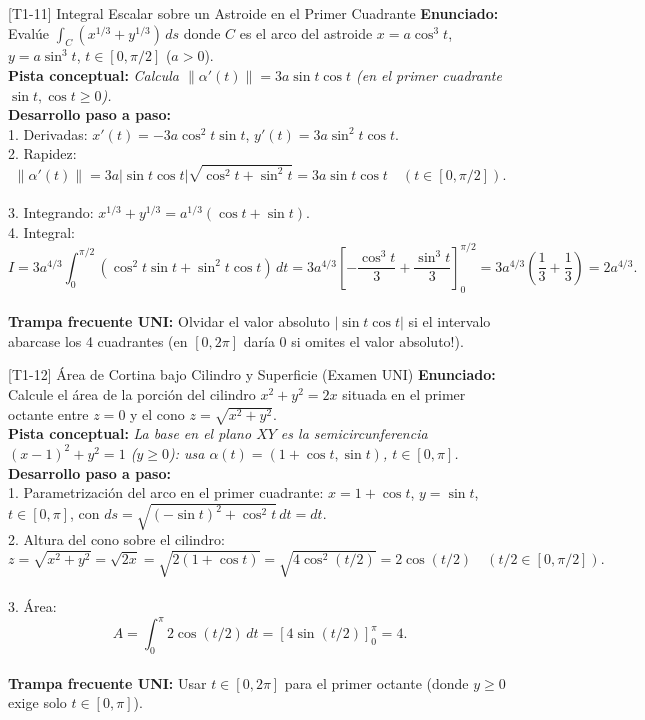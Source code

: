 \documentclass[11pt,a4paper]{article}
\begin{document}
\begin{ejerciciobox}{[T1-11] Integral Escalar sobre un Astroide en el Primer Cuadrante}
\textbf{Enunciado:} Evalúe $\int_C (x^{1/3} + y^{1/3})\,ds$ donde $C$ es el arco del astroide $x = a\cos^3 t$, $y = a\sin^3 t$, $t \in [0, \pi/2]$ ($a > 0$).\\[0.2cm]
\textbf{Pista conceptual:} \emph{Calcula $\|\alpha'(t)\| = 3a\sin t\cos t$ (en el primer cuadrante $\sin t, \cos t \ge 0$).}\\[0.2cm]
\textbf{Desarrollo paso a paso:}\\
1. Derivadas: $x'(t) = -3a\cos^2 t\sin t$, $y'(t) = 3a\sin^2 t\cos t$.\\
2. Rapidez:\\
$$\|\alpha'(t)\| = 3a|\sin t\cos t|\sqrt{\cos^2 t + \sin^2 t} = 3a\sin t\cos t \quad (t \in [0,\pi/2]).$$\\
3. Integrando: $x^{1/3} + y^{1/3} = a^{1/3}(\cos t + \sin t)$.\\
4. Integral:\\
$$I = 3a^{4/3}\int_0^{\pi/2} (\cos^2 t\sin t + \sin^2 t\cos t)\,dt = 3a^{4/3}\left[-\frac{\cos^3 t}{3} + \frac{\sin^3 t}{3}\right]_0^{\pi/2} = 3a^{4/3}\left(\frac{1}{3} + \frac{1}{3}\right) = 2a^{4/3}.$$\\[0.2cm]
\textbf{Trampa frecuente UNI:} Olvidar el valor absoluto $|\sin t\cos t|$ si el intervalo abarcase los 4 cuadrantes (en $[0,2\pi]$ daría $0$ si omites el valor absoluto!).
\end{ejerciciobox}

\begin{ejerciciobox}{[T1-12] Área de Cortina bajo Cilindro y Superficie (Examen UNI)}
\textbf{Enunciado:} Calcule el área de la porción del cilindro $x^2 + y^2 = 2x$ situada en el primer octante entre $z = 0$ y el cono $z = \sqrt{x^2 + y^2}$.\\[0.2cm]
\textbf{Pista conceptual:} \emph{La base en el plano $XY$ es la semicircunferencia $(x-1)^2 + y^2 = 1$ ($y \ge 0$): usa $\alpha(t) = (1 + \cos t, \sin t)$, $t \in [0, \pi]$.}\\[0.2cm]
\textbf{Desarrollo paso a paso:}\\
1. Parametrización del arco en el primer cuadrante: $x = 1 + \cos t$, $y = \sin t$, $t \in [0, \pi]$, con $ds = \sqrt{(-\sin t)^2 + \cos^2 t}\,dt = dt$.\\
2. Altura del cono sobre el cilindro:\\
$$z = \sqrt{x^2+y^2} = \sqrt{2x} = \sqrt{2(1+\cos t)} = \sqrt{4\cos^2(t/2)} = 2\cos(t/2) \quad (t/2 \in [0,\pi/2]).$$\\
3. Área:\\
$$A = \int_0^\pi 2\cos(t/2)\,dt = \left[4\sin(t/2)\right]_0^\pi = 4.$$\\[0.2cm]
\textbf{Trampa frecuente UNI:} Usar $t \in [0, 2\pi]$ para el primer octante (donde $y \ge 0$ exige solo $t \in [0,\pi]$).
\end{ejerciciobox}
\end{document}
